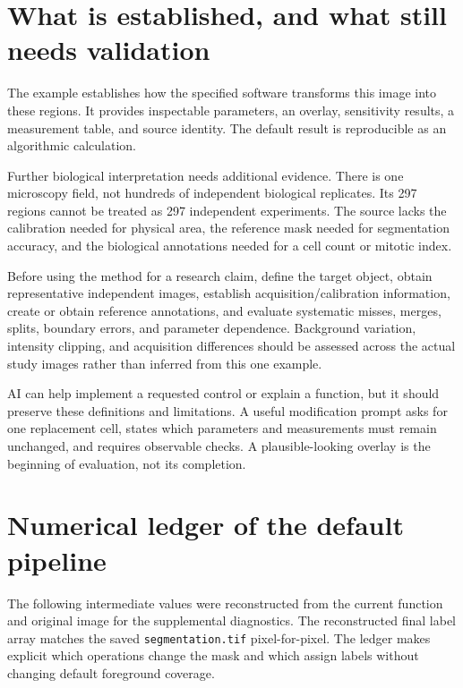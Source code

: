 \documentclass[11pt,letterpaper]{article}
\newcommand{\field}[1]{\nolinkurl{#1}}
\begin{document}
\section{What is established, and what still needs validation}

The example establishes how the specified software transforms this image into these regions. It provides inspectable parameters, an overlay, sensitivity results, a measurement table, and source identity. The default result is reproducible as an algorithmic calculation.

Further biological interpretation needs additional evidence. There is one microscopy field, not hundreds of independent biological replicates. Its 297 regions cannot be treated as 297 independent experiments. The source lacks the calibration needed for physical area, the reference mask needed for segmentation accuracy, and the biological annotations needed for a cell count or mitotic index.

Before using the method for a research claim, define the target object, obtain representative independent images, establish acquisition/calibration information, create or obtain reference annotations, and evaluate systematic misses, merges, splits, boundary errors, and parameter dependence. Background variation, intensity clipping, and acquisition differences should be assessed across the actual study images rather than inferred from this one example.

AI can help implement a requested control or explain a function, but it should preserve these definitions and limitations. A useful modification prompt asks for one replacement cell, states which parameters and measurements must remain unchanged, and requires observable checks. A plausible-looking overlay is the beginning of evaluation, not its completion.

\appendix
\section{Numerical ledger of the default pipeline}
\label{app:ledger}

The following intermediate values were reconstructed from the current function and original image for the supplemental diagnostics. The reconstructed final label array matches the saved \field{segmentation.tif} pixel-for-pixel. The ledger makes explicit which operations change the mask and which assign labels without changing default foreground coverage.
\end{document}
